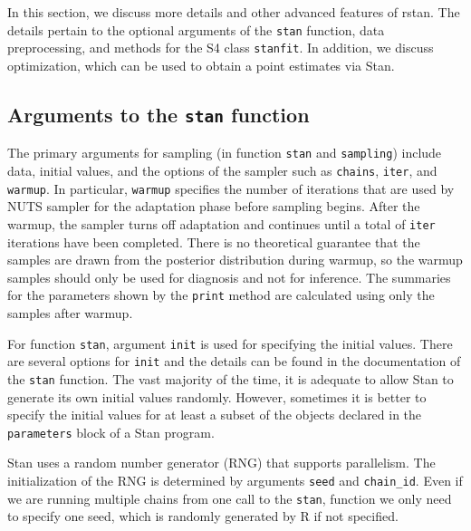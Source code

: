 \documentclass[12pt]{article}
\newcommand{\R}{R\xspace}
\newcommand{\Stan}{Stan\xspace}
\newcommand{\code}[1]{{\tt #1}}
\newcommand{\strong}[1]{\texorpdfstring%
          {{\normalfont\fontseries{b}\selectfont #1}}%
            {#1}}
\let\pkg=\strong
\begin{document}
                In this section, we discuss more details and other advanced 
                features of \pkg{rstan}. The details pertain to the optional
                arguments of the \code{stan} function, data preprocessing, and methods for the
                S4 class \code{stanfit}. In addition, we discuss optimization, which can be 
                used to obtain a point estimates via \Stan. 
                
                \subsection[Arguments to the \code{stan} function]{Arguments to the \code{stan} function} 
                
                The primary arguments for sampling (in function \code{stan} and 
                \code{sampling}) include data, initial values, and the options of the 
                sampler such as \code{chains}, \code{iter}, and \code{warmup}.
                In particular, \code{warmup} specifies the number of iterations 
                that are used by NUTS sampler for the adaptation phase before sampling begins.
                After the warmup, the sampler turns off adaptation and continues until a total of 
                \code{iter} iterations have been completed.
                There is no theoretical guarantee that the samples are drawn from the posterior distribution 
                during warmup, so the warmup samples should only be used for diagnosis and not for
                inference.  The summaries for the parameters shown by the \code{print} method
                are calculated using only the samples after warmup.
                
                For function \code{stan}, argument \code{init} is used for specifying
                the initial values.  There are several options for \code{init} and the 
                details can be found in the documentation of the \code{stan} function. The vast majority
                of the time, it is adequate to allow \Stan to generate its own initial values randomly.
                However, sometimes it is better to specify the initial values for at least a subset
                of the objects declared in the \code{parameters} block of a Stan program.
                
                \Stan uses a random number generator (RNG) that supports parallelism.
                The initialization of the RNG is determined by arguments \code{seed}
                and \code{chain\_id}.  Even if we are running multiple chains from one call to the \code{stan}, 
                function we only need to specify one seed, which is randomly generated by \R if not specified.
                
\end{document}
